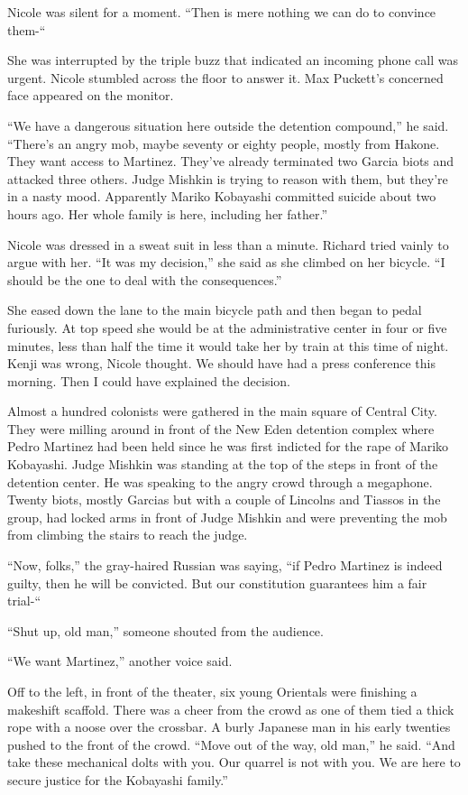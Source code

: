 \documentclass[]{article}
\begin{document}
{Nicole was silent for a moment. “Then is mere nothing we can do to convince them-“

She was interrupted by the triple buzz that indicated an incoming phone call was urgent. Nicole stumbled across the floor to answer it. Max Puckett’s concerned face appeared on the monitor.

“We have a dangerous situation here outside the detention compound,” he said. “There’s an angry mob, maybe seventy or eighty people, mostly from Hakone. They want access to Martinez. They’ve already terminated two Garcia biots and attacked three others. Judge Mishkin is trying to reason with them, but they’re in a nasty mood. Apparently Mariko Kobayashi committed suicide about two hours ago. Her whole family is here, including her father.”

Nicole was dressed in a sweat suit in less than a minute. Richard tried vainly to argue with her. “It was my decision,” she said as she climbed on her bicycle. “I should be the one to deal with the consequences.”

She eased down the lane to the main bicycle path and then began to pedal furiously. At top speed she would be at the administrative center in four or five minutes, less than half the time it would take her by train at this time of night. Kenji was wrong, Nicole thought. We should have had a press conference this morning. Then I could have explained the decision.

Almost a hundred colonists were gathered in the main square of Central City. They were milling around in front of the New Eden detention complex where Pedro Martinez had been held since he was first indicted for the rape of Mariko Kobayashi. Judge Mishkin was standing at the top of the steps in front of the detention center. He was speaking to the angry crowd through a megaphone. Twenty biots, mostly Garcias but with a couple of Lincolns and Tiassos in the group, had locked arms in front of Judge Mishkin and were preventing the mob from climbing the stairs to reach the judge.

“Now, folks,” the gray-haired Russian was saying, “if Pedro Martinez is indeed guilty, then he will be convicted. But our constitution guarantees him a fair trial-“

“Shut up, old man,” someone shouted from the audience.

“We want Martinez,” another voice said.

Off to the left, in front of the theater, six young Orientals were finishing a makeshift scaffold. There was a cheer from the crowd as one of them tied a thick rope with a noose over the crossbar. A burly Japanese man in his early twenties pushed to the front of the crowd. “Move out of the way, old man,” he said. “And take these mechanical dolts with you. Our quarrel is not with you. We are here to secure justice for the Kobayashi family.”

}
\end{document}
